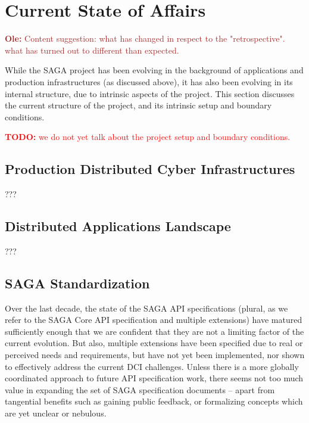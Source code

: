 \documentclass{article}
\newcommand{\B}[1]{\textbf{#1}}
\newcommand{\todo}[1]{{\textcolor{red}{\B{TODO:} #1 }}}
\newcommand{\ownote}[1]{{\textcolor{Brown}{   \B{Ole:     } #1 }}}
\newcommand{\todo}[1]{}
\newcommand{\ownote}[1]{}
\begin{document}

\section{Current State of Affairs}
\label{sec:state}

 \ownote{Content suggestion: what has changed in respect to the
 "retrospective". what has turned out to different than expected.}

 While the SAGA project has been evolving in the background of
 applications and production infrastructures (as discussed above), it
 has also been evolving in its internal structure, due to intrinsic
 aspects of the project.  This section discusses the current structure
 of the project, and its intrinsic setup and boundary conditions.

 \todo{we do not yet talk about the project setup and boundary
 conditions.}


 \subsection{Production Distributed Cyber Infrastructures}
  
  ???


 \subsection{Distributed Applications Landscape}
 
  ???


 \subsection{SAGA Standardization}

  Over the last decade, the state of the SAGA API specifications
  (plural, as we refer to the SAGA Core API specification and multiple
  extensions) have matured sufficiently enough that we are confident
  that they are not a limiting factor of the current evolution.  But
  also, multiple extensions have been specified due to real or perceived
  needs and requirements, but have not yet been implemented, nor shown
  to effectively address the current DCI challenges.  Unless there is
  a more globally coordinated approach to future API specification work,
  there seems not too much value in expanding the set of SAGA
  specification documents -- apart from tangential benefits such as
  gaining public feedback, or formalizing concepts which are yet unclear
  or nebulous.
\end{document}
